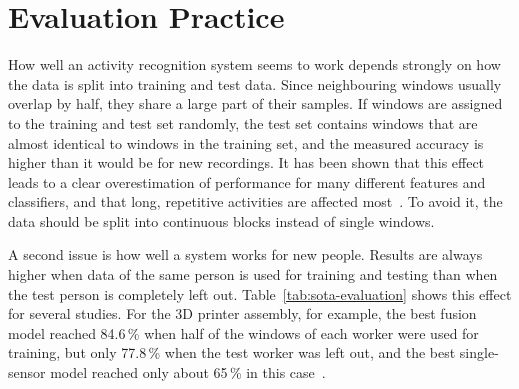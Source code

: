\section{Evaluation Practice}
\label{sec:sota-evaluation}

How well an activity recognition system seems to work depends strongly on how
the data is split into training and test data. Since neighbouring windows
usually overlap by half, they share a large part of their samples. If windows
are assigned to the training and test set randomly, the test set contains
windows that are almost identical to windows in the training set, and the
measured accuracy is higher than it would be for new recordings. It has been
shown that this effect leads to a clear overestimation of performance for many
different features and classifiers, and that long, repetitive activities are
affected most~\cite{hammerla2015lets}. To avoid it, the data should be split
into continuous blocks instead of single windows.

A second issue is how well a system works for new people. Results are always
higher when data of the same person is used for training and testing than when
the test person is completely left out. Table~\ref{tab:sota-evaluation} shows
this effect for several studies. For the 3D printer assembly, for example, the
best fusion model reached 84.6\,\% when half of the windows of each worker were
used for training, but only 77.8\,\% when the test worker was left out, and the
best single-sensor model reached only about 65\,\% in this
case~\cite{alamin2019action}.

